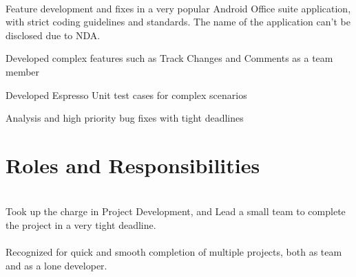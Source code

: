 \documentclass[]{deedy-resume-openfont}
\begin{document}
\\
Feature development and fixes in a very popular Android Office suite application, with strict coding guidelines and standards. The name of the application can’t be disclosed due to NDA.\\
\begin{tightemize}
	\item Developed complex features such as Track Changes and Comments as a team member
	\item Developed Espresso Unit test cases for complex scenarios
	\item Analysis and high priority bug fixes with tight deadlines
\end{tightemize}
\sectionsep
%
%
\section{Roles and Responsibilities}
  \\
Took up the charge in Project Development, and Lead a small team to complete the project in a very tight deadline.\\
\sectionsep
{}  \\
Recognized for quick and smooth completion of multiple projects, both as team and as a lone developer.\\
\sectionsep
\ 
\end{document}
